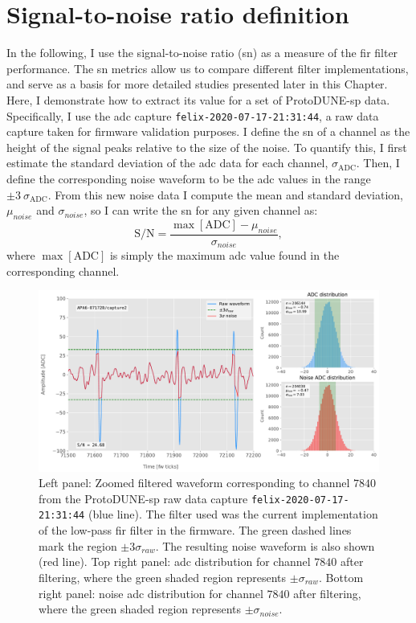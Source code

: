 \section{Signal-to-noise ratio definition}
\label{sec:matched_filter_sn_definition}

In the following, I use the signal-to-noise ratio (\gls{sn}) as a measure of the \gls{fir} filter performance. The \gls{sn} metrics allow us to compare different filter implementations, and serve as a basis for more detailed studies presented later in this Chapter. Here, I demonstrate how to extract its value for a set of ProtoDUNE-\gls{sp} data. Specifically, I use the \gls{adc} capture \texttt{felix-2020-07-17-21:31:44}, a raw data capture taken for firmware validation purposes. I define the \gls{sn} of a channel as the height of the signal peaks relative to the size of the noise. To quantify this, I first estimate the standard deviation of the \gls{adc} data for each channel, $\sigma_{\mathrm{ADC}}$. Then, I define the corresponding noise waveform to be the \gls{adc} values in the range $\pm 3~\sigma_{\mathrm{ADC}}$. From this new noise data I compute the mean and standard deviation, $\mu_{noise}$ and $\sigma_{noise}$, so I can write the \gls{sn} for any given channel as:
\begin{equation}
	\mathrm{S/N} = \frac{\max{[\mathrm{ADC}]} - \mu_{noise}}{\sigma_{noise}},
\end{equation}
where $\max{[\mathrm{ADC}]}$ is simply the maximum \gls{adc} value found in the corresponding channel.

\begin{figure}[t]
	\centering
	\includegraphics[width=1\linewidth]{Images/Matched_Filter/waveform_example_fir}
	\caption[Example filtered waveform from a ProtoDUNE-\gls{sp} raw data capture.]{Left panel: Zoomed filtered waveform corresponding to channel $7840$ from the ProtoDUNE-\gls{sp} raw data capture \texttt{felix-2020-07-17-21:31:44} (blue line). The filter used was the current implementation of the low-pass \gls{fir} filter in the firmware. The green dashed lines mark the region $\pm3\sigma_{raw}$. The resulting noise waveform is also shown (red line). Top right panel: \gls{adc} distribution for channel $7840$ after filtering, where the green shaded region represents $\pm \sigma_{raw}$. Bottom right panel: noise \gls{adc} distribution for channel $7840$ after filtering, where the green shaded region represents $\pm \sigma_{noise}$.}
	\label{fig:adcs_fir}
\end{figure}

